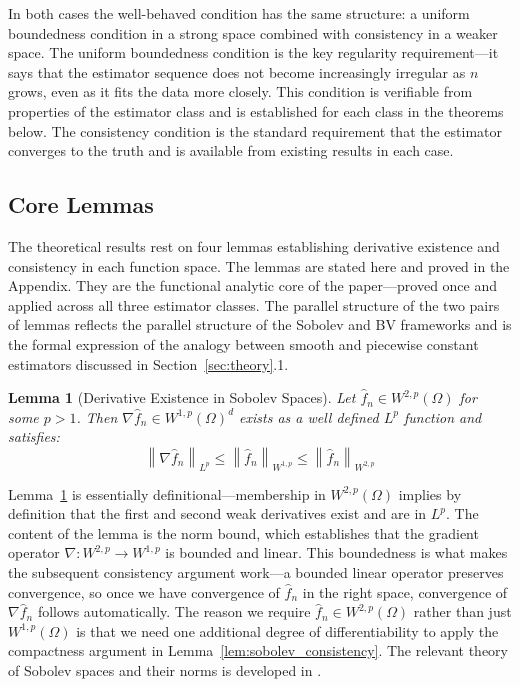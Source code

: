 \documentclass[12pt]{article}
\newtheorem{lemma}{Lemma}
\newcommand{\norm}[1]{\left\| #1 \right\|}
\newcommand{\Wonep}{W^{1,p}(\Omega)}
\newcommand{\Wtwop}{W^{2,p}(\Omega)}
\newcommand{\fn}{\hat{f}_n}
\begin{document}
	In both cases the well-behaved condition has the same structure: a uniform
	boundedness condition in a strong space combined with consistency in a weaker space.
	The uniform boundedness condition is the key regularity requirement---it says that
	the estimator sequence does not become increasingly irregular as $n$ grows, even as
	it fits the data more closely. This condition is verifiable from properties of the
	estimator class and is established for each class in the theorems below. The
	consistency condition is the standard requirement that the estimator converges to the
	truth and is available from existing results in each case.
	
	\subsection{Core Lemmas}
	
	The theoretical results rest on four lemmas establishing derivative existence and
	consistency in each function space. The lemmas are stated here and proved in the
	Appendix. They are the functional analytic core of the paper---proved once and
	applied across all three estimator classes. The parallel structure of the two pairs
	of lemmas reflects the parallel structure of the Sobolev and BV frameworks and is
	the formal expression of the analogy between smooth and piecewise constant estimators
	discussed in Section~\ref{sec:theory}.1.
	
	\begin{lemma}[Derivative Existence in Sobolev Spaces]
		\label{lem:sobolev_existence}
		Let $\fn \in \Wtwop$ for some $p > 1$. Then $\nabla \fn \in W^{1,p}(\Omega)^d$
		exists as a well defined $L^p$ function and satisfies:
		\begin{equation}
			\norm{\nabla \fn}_{L^p} \leq \norm{\fn}_{W^{1,p}} \leq \norm{\fn}_{W^{2,p}}
		\end{equation}
	\end{lemma}
	
	Lemma~\ref{lem:sobolev_existence} is essentially definitional---membership in
	$\Wtwop$ implies by definition that the first and second weak derivatives exist and
	are in $L^p$. The content of the lemma is the norm bound, which establishes that
	the gradient operator $\nabla: W^{2,p} \to W^{1,p}$ is bounded and linear. This
	boundedness is what makes the subsequent consistency argument work---a bounded linear
	operator preserves convergence, so once we have convergence of $\fn$ in the right
	space, convergence of $\nabla \fn$ follows automatically. The reason we require
	$\fn \in \Wtwop$ rather than just $\Wonep$ is that we need one additional degree of
	differentiability to apply the compactness argument in
	Lemma~\ref{lem:sobolev_consistency}. The relevant theory of Sobolev spaces and their
	norms is developed in \citet[Chapter~5]{evans2010pde}.
	
\end{document}

